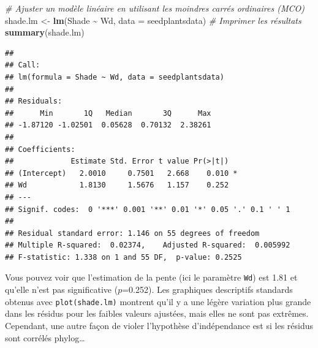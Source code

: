\documentclass[
]{book}
\newenvironment{Shaded}{\begin{snugshade}}{\end{snugshade}}
\newcommand{\AttributeTok}[1]{\textcolor[rgb]{0.13,0.29,0.53}{#1}}
\newcommand{\CommentTok}[1]{\textcolor[rgb]{0.56,0.35,0.01}{\textit{#1}}}
\newcommand{\FunctionTok}[1]{\textcolor[rgb]{0.13,0.29,0.53}{\textbf{#1}}}
\newcommand{\NormalTok}[1]{#1}
\newcommand{\OtherTok}[1]{\textcolor[rgb]{0.56,0.35,0.01}{#1}}
\newcommand{\SpecialCharTok}[1]{\textcolor[rgb]{0.81,0.36,0.00}{\textbf{#1}}}
\begin{document}
\begin{Shaded}
\begin{Highlighting}[]
\CommentTok{\# Ajuster un modèle linéaire en utilisant les moindres carrés ordinaires (MCO)}
\NormalTok{shade.lm }\OtherTok{\textless{}{-}} \FunctionTok{lm}\NormalTok{(Shade }\SpecialCharTok{\textasciitilde{}}\NormalTok{ Wd, }\AttributeTok{data =}\NormalTok{ seedplantsdata)}
\CommentTok{\# Imprimer les résultats}
\FunctionTok{summary}\NormalTok{(shade.lm)}
\end{Highlighting}
\end{Shaded}

\begin{verbatim}
## 
## Call:
## lm(formula = Shade ~ Wd, data = seedplantsdata)
## 
## Residuals:
##      Min       1Q   Median       3Q      Max 
## -1.87120 -1.02501  0.05628  0.70132  2.38261 
## 
## Coefficients:
##             Estimate Std. Error t value Pr(>|t|)  
## (Intercept)   2.0010     0.7501   2.668    0.010 *
## Wd            1.8130     1.5676   1.157    0.252  
## ---
## Signif. codes:  0 '***' 0.001 '**' 0.01 '*' 0.05 '.' 0.1 ' ' 1
## 
## Residual standard error: 1.146 on 55 degrees of freedom
## Multiple R-squared:  0.02374,    Adjusted R-squared:  0.005992 
## F-statistic: 1.338 on 1 and 55 DF,  p-value: 0.2525
\end{verbatim}

Vous pouvez voir que l'estimation de la pente (ici le paramètre \texttt{Wd}) est 1.81 et qu'elle n'est pas significative (\(p\)=0.252). Les graphiques descriptifs standards obtenus avec \texttt{plot(shade.lm)} montrent qu'il y a une légère variation plus grande dans les résidus pour les faibles valeurs ajustées, mais elles ne sont pas extrêmes. Cependant, une autre façon de violer l'hypothèse d'indépendance est si les résidus sont corrélés phylog\ldots{}
\end{document}
